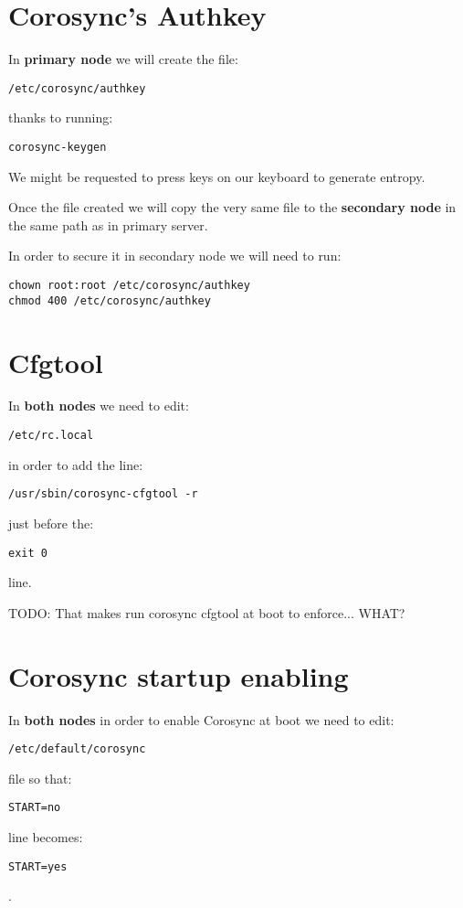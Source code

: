 \section {Corosync's Authkey}
In \textbf{primary node} we will create the file:
\begin{verbatim}
/etc/corosync/authkey
\end{verbatim}
thanks to running:
\begin{verbatim}
corosync-keygen
\end{verbatim}
We might be requested to press keys on our keyboard to generate entropy.

Once the file created we will copy the very same file to the \textbf{secondary node} in the same path as in primary server.

In order to secure it in secondary node we will need to run:
\begin{verbatim}
chown root:root /etc/corosync/authkey
chmod 400 /etc/corosync/authkey
\end{verbatim}

\section {Cfgtool}

In \textbf{both nodes} we need to edit:
\begin{verbatim}
/etc/rc.local
\end{verbatim}
in order to add the line:
\begin{verbatim}
/usr/sbin/corosync-cfgtool -r
\end{verbatim}
just before the:
\begin{verbatim}
exit 0
\end{verbatim}
line.

TODO: That makes run corosync cfgtool at boot to enforce... WHAT?

\section {Corosync startup enabling}
In \textbf{both nodes} in order to enable Corosync at boot we need to edit:
\begin{verbatim}
/etc/default/corosync
\end{verbatim}
file so that:
\begin{verbatim}
START=no
\end{verbatim}
line becomes:
\begin{verbatim}
START=yes
\end{verbatim}
.

